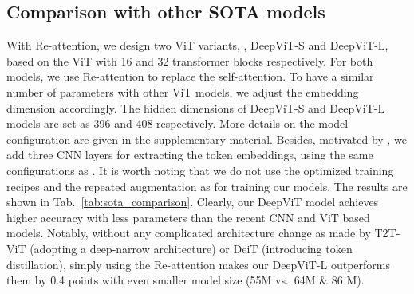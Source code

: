 \documentclass[10pt,twocolumn,letterpaper]{article}
\newcommand{\nameofatten}{Re-attention}
\begin{document}
\subsection{Comparison with other SOTA models}






With \nameofatten{}, we design two ViT variants, \ie,  DeepViT-S and DeepViT-L,  based on the ViT with 16 and 32 transformer blocks respectively. For both   models, we use \nameofatten{} to replace the   self-attention. To have a similar number of parameters with other ViT models, we adjust the embedding dimension accordingly. The hidden dimensions of  DeepViT-S and DeepViT-L models are set as 396 and 408 respectively. More details on the model configuration are given in the supplementary material.
 Besides, motivated by \cite{yuan2021tokens}, we add   three CNN layers for extracting  the token embeddings, using the same configurations as     \cite{yuan2021tokens}.  It is worth noting that we do not use the optimized training recipes and the repeated augmentation as  \cite{touvron2020training} for training our models.  The results are shown in Tab.~\ref{tab:sota_comparison}.  Clearly, our DeepViT model achieves higher accuracy with less  parameters than the recent CNN  and ViT based models. Notably, without any complicated architecture change as made by T2T-ViT \cite{yuan2021tokens} (adopting a deep-narrow architecture)  or  DeiT \cite{touvron2020training} (introducing token distillation), simply using the \nameofatten{} makes our DeepViT-L outperforms them  by 0.4 points  with even smaller model size (55M vs.\ 64M \& 86 M). 
\end{document}
